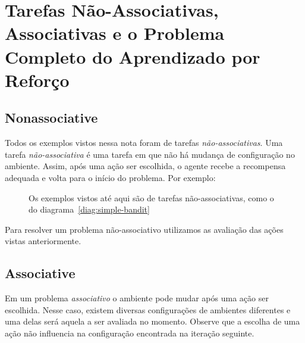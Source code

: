 \documentclass{article}
\begin{document}
            
            
    \section{Tarefas Não-Associativas, Associativas e o Problema Completo do Aprendizado por Reforço}

        \subsection{Nonassociative}
            
            Todos os exemplos vistos nessa nota foram de tarefas \emph{não-associativas}. Uma tarefa \emph{não-associativa} é uma tarefa em que não há mudança de configuração no ambiente. Assim, após uma ação ser escolhida, o agente recebe a recompensa adequada e volta para o início do problema. Por exemplo:            
            
            \begin{figure}[ht]
                \centering
                \simplebandit
                \caption{Os exemplos vistos até aqui são de tarefas não-associativas, como o do diagrama~\ref{diag:simple-bandit}}
                \label{diag:non-associative}
            \end{figure}
            
            Para resolver um problema não-associativo utilizamos as avaliação das ações vistas anteriormente.
    
        \subsection{Associative}
        
            Em um problema \emph{associativo} o ambiente pode mudar após uma ação ser escolhida. Nesse caso, existem diversas configurações de ambientes diferentes e uma delas será aquela a ser avaliada no momento. Observe que a escolha de uma ação não influencia na configuração encontrada na iteração seguinte.
    
\end{document}
